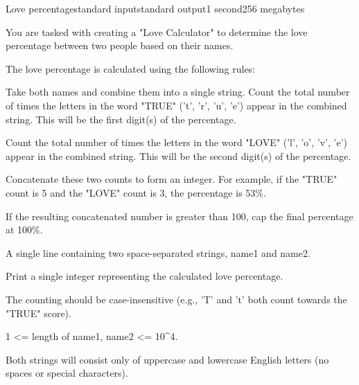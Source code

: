 \begin{problem}{Love percentage}{standard input}{standard output}{1 second}{256 megabytes}

You are tasked with creating a "Love Calculator" to determine the love percentage between two people based on their names.

​The love percentage is calculated using the following rules:

​Take both names and combine them into a single string.
​Count the total number of times the letters in the word "TRUE" ('t', 'r', 'u', 'e') appear in the combined string. This will be the first digit(s) of the percentage.

​Count the total number of times the letters in the word "LOVE" ('l', 'o', 'v', 'e') appear in the combined string. This will be the second digit(s) of the percentage.

​Concatenate these two counts to form an integer. For example, if the "TRUE" count is 5 and the "LOVE" count is 3, the percentage is 53\%.

​If the resulting concatenated number is greater than 100, cap the final percentage at 100\%.


\InputFile
​A single line containing two space-separated strings, name1 and name2.

\OutputFile
​Print a single integer representing the calculated love percentage.


\Note
The counting should be case-insensitive (e.g., 'T' and 't' both count towards the "TRUE" score).

1 <= length of name1, name2 <= 10^4.

Both strings will consist only of uppercase and lowercase English letters (no spaces or special characters).

\end{problem}

